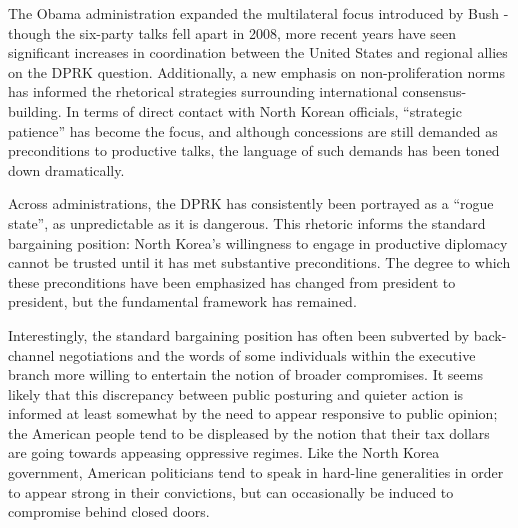 The Obama administration expanded the multilateral focus introduced by Bush - though the six-party talks fell apart in 2008, more recent years have seen significant increases in coordination between the United States and regional allies on the DPRK question. Additionally, a new emphasis on non-proliferation norms has informed the rhetorical strategies surrounding international consensus-building. In terms of direct contact with North Korean officials, ``strategic patience'' has become the focus, and although concessions are still demanded as preconditions to productive talks, the language of such demands has been toned down dramatically.

Across administrations, the DPRK has consistently been portrayed as a ``rogue state'', as unpredictable as it is dangerous. This rhetoric informs the standard bargaining position: North Korea's willingness to engage in productive diplomacy cannot be trusted until it has met substantive preconditions. The degree to which these preconditions have been emphasized has changed from president to president, but the fundamental framework has remained. 

Interestingly, the standard bargaining position has often been subverted by back-channel negotiations and the words of some individuals within the executive branch more willing to entertain the notion of broader compromises. It seems likely that this discrepancy between public posturing and quieter action is informed at least somewhat by the need to appear responsive to public opinion; the American people tend to be displeased by the notion that their tax dollars are going towards appeasing oppressive regimes. Like the North Korea government, American politicians tend to speak in hard-line generalities in order to appear strong in their convictions, but can occasionally be induced to compromise behind closed doors.
